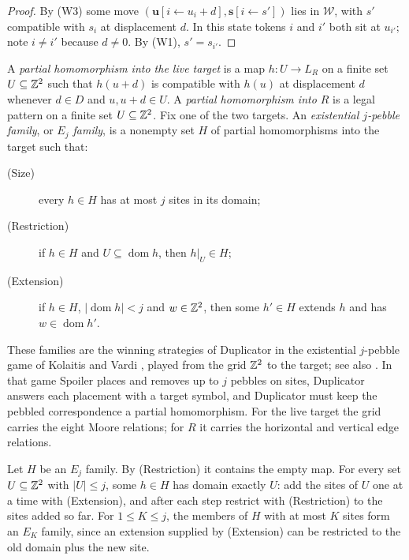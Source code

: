 \begin{proof}
By (W3) some move $(\mathbf u[i\leftarrow u_i+d],\mathbf s[i\leftarrow s'])$ lies in $\mathcal W$, with $s'$ compatible with $s_i$ at displacement $d$. In this state tokens $i$ and $i'$ both sit at $u_{i'}$; note $i\ne i'$ because $d\ne0$. By (W1), $s'=s_{i'}$.
\end{proof}

\begin{definition}\label{set:def-pebble}
A \emph{partial homomorphism into the live target} is a map $h\colon U\to L_R$ on a finite set $U\subseteq\mathbb{Z}^2$ such that $h(u+d)$ is compatible with $h(u)$ at displacement $d$ whenever $d\in D$ and $u,u+d\in U$. A \emph{partial homomorphism into $R$} is a legal pattern on a finite set $U\subseteq\mathbb{Z}^2$. Fix one of the two targets. An \emph{existential $j$-pebble family}, or \emph{$E_j$ family}, is a nonempty set $H$ of partial homomorphisms into the target such that:
\begin{description}
\item[(Size)] every $h\in H$ has at most $j$ sites in its domain;
\item[(Restriction)] if $h\in H$ and $U\subseteq\operatorname{dom}h$, then $h|_U\in H$;
\item[(Extension)] if $h\in H$, $|\operatorname{dom}h|<j$ and $w\in\mathbb{Z}^2$, then some $h'\in H$ extends $h$ and has $w\in\operatorname{dom}h'$.
\end{description}
\end{definition}

These families are the winning strategies of Duplicator in the existential $j$-pebble game of Kolaitis and Vardi \cite{KolaitisVardi00}, played from the grid $\mathbb{Z}^2$ to the target; see also \cite{ABD07}. In that game Spoiler places and removes up to $j$ pebbles on sites, Duplicator answers each placement with a target symbol, and Duplicator must keep the pebbled correspondence a partial homomorphism. For the live target the grid carries the eight Moore relations; for $R$ it carries the horizontal and vertical edge relations.

\begin{remark}\label{set:pebble-basic}
Let $H$ be an $E_j$ family. By (Restriction) it contains the empty map. For every set $U\subseteq\mathbb{Z}^2$ with $|U|\le j$, some $h\in H$ has domain exactly $U$: add the sites of $U$ one at a time with (Extension), and after each step restrict with (Restriction) to the sites added so far. For $1\le K\le j$, the members of $H$ with at most $K$ sites form an $E_K$ family, since an extension supplied by (Extension) can be restricted to the old domain plus the new site.
\end{remark}

